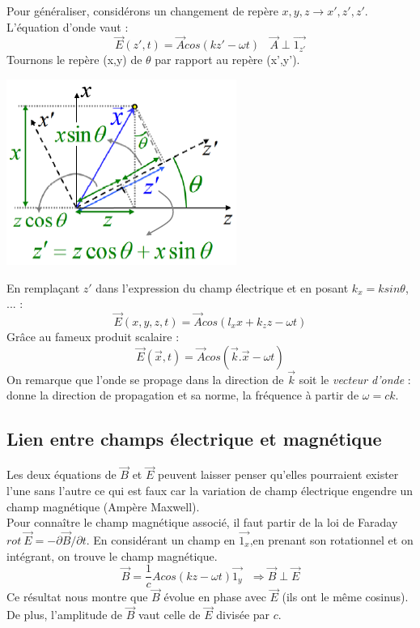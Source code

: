 \documentclass	[11pt, a4paper, openany]{book}
\begin{document}
Pour généraliser, considérons un changement de repère $x, y, z \rightarrow x', z', z'$. L'équation d'onde vaut :
\begin{equation}
\vec{E}(z', t) = \vec{A}cos(kz' - \omega t)\ \ \ \ \vec{A} \perp \vec{1_{z'}}
\end{equation}
Tournons le repère (x,y) de $\theta$ par rapport au repère (x',y').
\begin{center}
\includegraphics[scale=0.4]{oo/image36.png}
\end{center}
En remplaçant $z'$ dans l'expression du champ électrique et en posant $k_x = ksin\theta$, ... :
\begin{equation}
\vec{E}(x, y, z, t) = \vec{A}cos(l_x x + k_z z - \omega t)
\end{equation}
Grâce au fameux produit scalaire :
\begin{equation}
\vec{E} (\vec{x}, t) = \vec{A}cos(\vec{k}.\vec{x} - \omega t)
\end{equation}
On remarque que l'onde se propage dans la direction de $\vec{k}$ soit le \textit{vecteur d'onde} : donne la direction de propagation et sa norme, la fréquence à partir de $\omega = ck$.

\subsection{Lien entre champs électrique et magnétique}
Les deux équations de $\vec{B}$ et $\vec{E}$ peuvent laisser penser qu'elles pourraient exister l'une sans l'autre ce qui est faux car la variation de champ électrique engendre un champ magnétique (Ampère Maxwell).\\

Pour connaître le champ magnétique associé, il faut partir de la loi de Faraday $rot\ \vec{E} = -\partial\vec{B}/\partial t$. En considérant un champ en $\vec{1_x}$,en prenant son rotationnel et on intégrant, on trouve le champ magnétique.
\begin{equation}
\vec{B} = \frac{1}{c}Acos(kz - \omega t)\vec{1_y}\ \ \ \Rightarrow \vec{B} \perp \vec{E}
\end{equation}
Ce résultat nous montre que $\vec{B}$ évolue en phase avec $\vec{E}$ (ils ont le même cosinus).\\
De plus, l'amplitude de $\vec{B}$ vaut celle de $\vec{E}$ divisée par $c$.
\end{document}
